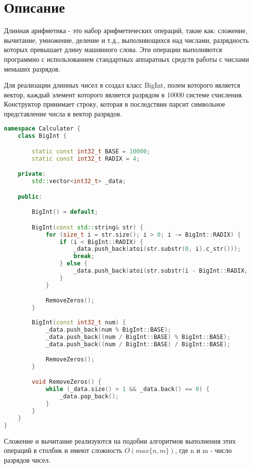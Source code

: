 \section{Описание}

Длинная арифметика - это набор арифметических операций, такие как: сложение, вычитание, умножение, деление и т.д., выполняющихся над числами, разрядность которых превышает длину машинного слова. Эти операции выполняются программно с использованием стандартных аппаратных средств работы с числами меньших разрядов.

Для реализации длинных чисел я создал класс BigInt, полем которого является вектор, каждый элемент которого является разрядом в 10000 системе счисления. Конструктор принимает строку, которая в последствии парсит символьное представление числа в вектор разрядов.

\begin{lstlisting}[language=c++]
namespace Calculater {
    class BigInt {

        static const int32_t BASE = 10000;
        static const int32_t RADIX = 4;

    private:
        std::vector<int32_t> _data;

    public:

        BigInt() = default;

        BigInt(const std::string& str) {
            for (size_t i = str.size(); i > 0; i -= BigInt::RADIX) {
                if (i < BigInt::RADIX) {
                    _data.push_back(atoi(str.substr(0, i).c_str()));
                    break;
                } else {
                    _data.push_back(atoi(str.substr(i - BigInt::RADIX, BigInt::RADIX).c_str()));
                }     
            }

            RemoveZeros();
        }
        
        BigInt(const int32_t num) {
            _data.push_back(num % BigInt::BASE);
            _data.push_back((num / BigInt::BASE) % BigInt::BASE);
            _data.push_back((num / BigInt::BASE) / BigInt::BASE);

            RemoveZeros();
        }

        void RemoveZeros() {
            while (_data.size() > 1 && _data.back() == 0) {
                _data.pop_back();
            }
        }
    }
}
\end{lstlisting}
\pagebreak
Сложение и вычитание реализуются на подобии алгоритмов выполнения этих операций в столбик и имеют сложность $O(max\{n, m\})$, где n и m - число разрядов чисел.

